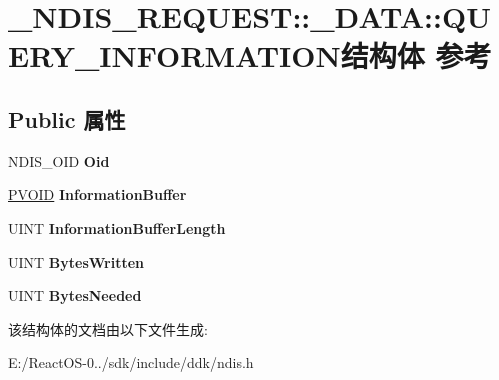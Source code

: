 \hypertarget{struct___n_d_i_s___r_e_q_u_e_s_t_1_1___d_a_t_a_1_1_q_u_e_r_y___i_n_f_o_r_m_a_t_i_o_n}{}\section{\+\_\+\+N\+D\+I\+S\+\_\+\+R\+E\+Q\+U\+E\+ST\+:\+:\+\_\+\+D\+A\+TA\+:\+:Q\+U\+E\+R\+Y\+\_\+\+I\+N\+F\+O\+R\+M\+A\+T\+I\+O\+N结构体 参考}
\label{struct___n_d_i_s___r_e_q_u_e_s_t_1_1___d_a_t_a_1_1_q_u_e_r_y___i_n_f_o_r_m_a_t_i_o_n}
\subsection*{Public 属性}
\begin{DoxyCompactItemize}
\item 
\mbox{\label{struct___n_d_i_s___r_e_q_u_e_s_t_1_1___d_a_t_a_1_1_q_u_e_r_y___i_n_f_o_r_m_a_t_i_o_n_a8a48855fe94b815ad9a3a42007da1024}} 
N\+D\+I\+S\+\_\+\+O\+ID {\bfseries Oid}
\item 
\mbox{\label{struct___n_d_i_s___r_e_q_u_e_s_t_1_1___d_a_t_a_1_1_q_u_e_r_y___i_n_f_o_r_m_a_t_i_o_n_ac27051b020db9edabf0b9f055d943b5f}} 
\hyperlink{interfacevoid}{P\+V\+O\+ID} {\bfseries Information\+Buffer}
\item 
\mbox{\label{struct___n_d_i_s___r_e_q_u_e_s_t_1_1___d_a_t_a_1_1_q_u_e_r_y___i_n_f_o_r_m_a_t_i_o_n_aa675b2ba71e6f23709f4dbb84c58dff5}} 
U\+I\+NT {\bfseries Information\+Buffer\+Length}
\item 
\mbox{\label{struct___n_d_i_s___r_e_q_u_e_s_t_1_1___d_a_t_a_1_1_q_u_e_r_y___i_n_f_o_r_m_a_t_i_o_n_a8c996beed4aea83b005795d72cb4e64f}} 
U\+I\+NT {\bfseries Bytes\+Written}
\item 
\mbox{\label{struct___n_d_i_s___r_e_q_u_e_s_t_1_1___d_a_t_a_1_1_q_u_e_r_y___i_n_f_o_r_m_a_t_i_o_n_a9ee6a5ae2b9f204ad558d98c670f1436}} 
U\+I\+NT {\bfseries Bytes\+Needed}
\end{DoxyCompactItemize}


该结构体的文档由以下文件生成\+:\begin{DoxyCompactItemize}
\item 
E\+:/\+React\+O\+S-\/0../sdk/include/ddk/ndis.\+h\end{DoxyCompactItemize}
